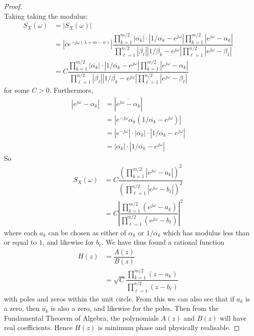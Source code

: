\documentclass[11pt]{report} %
\begin{document}
\begin{proof}
\begin{equation}
\end{equation}
Taking taking the modulus:
\begin{align}
S_{X}\left(\omega\right) &= \left|S_{X}\left(\omega\right)\right| \\
&= \left|\overline{c}e^{-j\omega\left(\lambda + m - n\right)}\right|\dfrac{\prod_{k = 1}^{m/2}\left|\overline{\alpha_{k}}\right|\cdot\left|1/\overline{\alpha_{k}} - e^{j\omega}\right|\prod_{k = 1}^{m/2}\left|e^{j\omega} - \alpha_{k}\right|}{\prod_{\ell = 1}^{n/2}\left|\overline{\beta_{\ell}}\right|\left|1/\overline{\beta_{k}} - e^{j\omega}\right|\prod_{\ell = 1}^{n/2}\left|e^{j\omega} - \beta_{\ell}\right|} \\
&= C\dfrac{\prod_{k = 1}^{m/2}\left|\overline{\alpha_{k}}\right|\cdot\left|1/\overline{\alpha_{k}} - e^{j\omega}\right|\prod_{k = 1}^{m/2}\left|e^{j\omega} - \alpha_{k}\right|}{\prod_{\ell = 1}^{n/2}\left|\overline{\beta_{\ell}}\right|\left|1/\overline{\beta_{k}} - e^{j\omega}\right|\prod_{\ell = 1}^{n/2}\left|e^{j\omega} - \beta_{\ell}\right|}
\end{align}
for some $C > 0$. Furthermore,
\begin{align}
\left|e^{j\omega} - \alpha_{k}\right| &= \left|\overline{e^{j\omega} - \alpha_{k}}\right| \\
&= \left|e^{-j\omega}\overline{\alpha_{k}}\left(1/\overline{\alpha_{k}} - e^{j\omega}\right)\right| \\
&= \left|e^{-j\omega}\right|\cdot\left|\overline{\alpha_{k}}\right|\cdot\left|1/\overline{\alpha_{k}} - e^{j\omega}\right| \\
&= \left|\overline{\alpha_{k}}\right|\cdot\left|1/\overline{\alpha_{k}} - e^{j\omega}\right|
\end{align}
So
\begin{align}
S_{X}\left(\omega\right) &= C\dfrac{\left(\prod_{k = 1}^{m/2}\left|e^{j\omega} - a_{k}\right|\right)^{2}}{\left(\prod_{\ell = 1}^{n/2}\left|e^{j\omega} - b_{\ell}\right|\right)^{2}} \\
&= C\left|\dfrac{\prod_{k = 1}^{m/2}\left(e^{j\omega} - a_{k}\right)}{\prod_{\ell = 1}^{n/2}\left(e^{j\omega} - b_{\ell}\right)}\right|^{2}
\end{align}
where each $a_{k}$ can be chosen as either of $\alpha_{k}$ or $1/\overline{\alpha_{k}}$ which has modulus less than or equal to $1$, and likewise for $b_{\ell}$. We have thus found a rational function
\begin{align}
H\left(z\right) &= \dfrac{A\left(z\right)}{B\left(z\right)} \\
&= \sqrt{C}\dfrac{\prod_{k = 1}^{m/2}\left(z - a_{k}\right)}{\prod_{\ell = 1}^{n/2}\left(z - b_{\ell}\right)}
\end{align}
with poles and zeros within the unit circle. From this we can also see that if $a_{k}$ is a zero, then $\overline{a_{k}}$ is also a zero, and likewise for the poles. Then from the Fundamental Theorem of Algebra, the polynomials $A\left(z\right)$ and $B\left(z\right)$ will have real coefficients. Hence $H\left(z\right)$ is minimum phase and physically realisable.
\end{proof}
\end{document}
